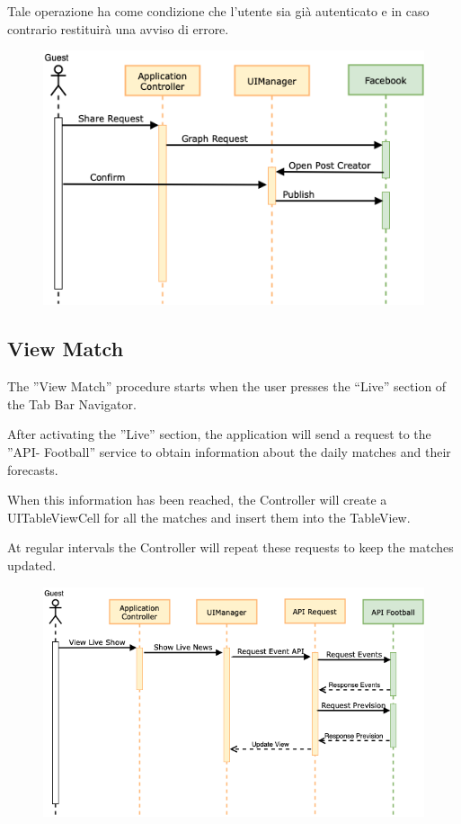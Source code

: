 \documentclass[numbers=noenddot, 12pt, a4paper, oneside]{scrbook}
\begin{document}
Tale operazione ha come condizione che l'utente sia già autenticato e in caso contrario restituirà una avviso di errore.

\begin{figure}[H]
	\centering
	\includegraphics[width=1\textwidth]{images/Sequence/SharePost}
\end{figure}


\newpage



\subsection*{View Match}
The ”View Match” procedure starts when the user presses the “Live” section of the Tab Bar Navigator.

After activating the ”Live” section, the application will send a request to the ”API- Football” service to obtain information about the daily matches and their forecasts.

When this information has been reached, the Controller will create a UITableViewCell for all the matches and insert them into the TableView.

At regular intervals the Controller will repeat these requests to keep the matches updated.

\begin{figure}[H]
	\centering
	\includegraphics[width=1\textwidth]{images/Sequence/SequenceLive}
\end{figure}
\end{document}
